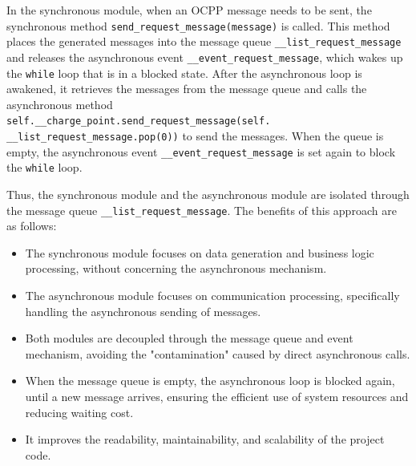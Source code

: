 \documentclass[
	english,
	ruledheaders=section,%
	class=report,%
	thesis={type=Report},%
	accentcolor=9c,%
	custommargins=true,%
	marginpar=false,%
	parskip=half-,%
	fontsize=11pt,%
	logofile={img/tuda_logo.pdf}, %
]{tudapub}
\begin{document}
In the synchronous module, when an \ac{OCPP} message needs to be sent, the synchronous method \texttt{send\_request\_message(message)} is called. This method places the generated messages into the message queue \texttt{\_\_list\_request\_message} and releases the asynchronous event \texttt{\_\_event\_request\_message}, which wakes up the \texttt{while} loop that is in a blocked state. After the asynchronous loop is awakened, it retrieves the messages from the message queue and calls the asynchronous method\\\texttt{self.\_\_charge\_point.send\_request\_message(self.\\\_\_list\_request\_message.pop(0))} to send the messages. When the queue is empty, the asynchronous event \texttt{\_\_event\_request\_message} is set again to block the \texttt{while} loop.



Thus, the synchronous module and the asynchronous module are isolated through the message queue \texttt{\_\_list\_request\_message}. The benefits of this approach are as follows:

\begin{itemize}
    \item The synchronous module focuses on data generation and business logic processing, without concerning the asynchronous mechanism. 
    \item The asynchronous module focuses on communication processing, specifically handling the asynchronous sending of messages. 
    \item Both modules are decoupled through the message queue and event mechanism, avoiding the "contamination" caused by direct asynchronous calls. 
    \item When the message queue is empty, the asynchronous loop is blocked again, until a new message arrives, ensuring the efficient use of system resources and reducing waiting cost. 
    \item It improves the readability, maintainability, and scalability of the project code. 
\end{itemize}
\end{document}
